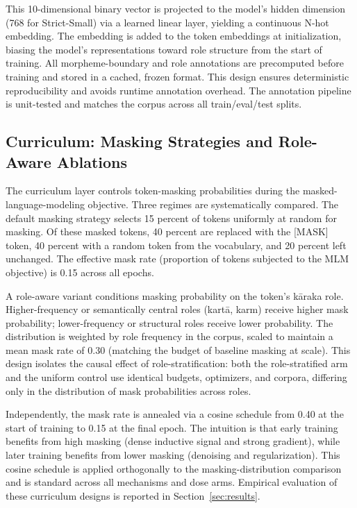 This 10-dimensional binary vector is projected to the model's hidden dimension (768 for Strict-Small) via a learned linear layer, yielding a continuous N-hot embedding. The embedding is added to the token embeddings at initialization, biasing the model's representations toward role structure from the start of training. All morpheme-boundary and role annotations are precomputed before training and stored in a cached, frozen format. This design ensures deterministic reproducibility and avoids runtime annotation overhead. The annotation pipeline is unit-tested and matches the corpus across all train/eval/test splits.

\subsection{Curriculum: Masking Strategies and Role-Aware Ablations}

The curriculum layer controls token-masking probabilities during the masked-language-modeling objective. Three regimes are systematically compared. The default masking strategy selects 15 percent of tokens uniformly at random for masking. Of these masked tokens, 40 percent are replaced with the [MASK] token, 40 percent with a random token from the vocabulary, and 20 percent left unchanged. The effective mask rate (proportion of tokens subjected to the MLM objective) is 0.15 across all epochs.

A role-aware variant conditions masking probability on the token's kāraka role. Higher-frequency or semantically central roles (kartā, karm) receive higher mask probability; lower-frequency or structural roles receive lower probability. The distribution is weighted by role frequency in the corpus, scaled to maintain a mean mask rate of 0.30 (matching the budget of baseline masking at scale). This design isolates the causal effect of role-stratification: both the role-stratified arm and the uniform control use identical budgets, optimizers, and corpora, differing only in the distribution of mask probabilities across roles.

Independently, the mask rate is annealed via a cosine schedule from 0.40 at the start of training to 0.15 at the final epoch. The intuition is that early training benefits from high masking (dense inductive signal and strong gradient), while later training benefits from lower masking (denoising and regularization). This cosine schedule is applied orthogonally to the masking-distribution comparison and is standard across all mechanisms and dose arms. Empirical evaluation of these curriculum designs is reported in Section~\ref{sec:results}.

